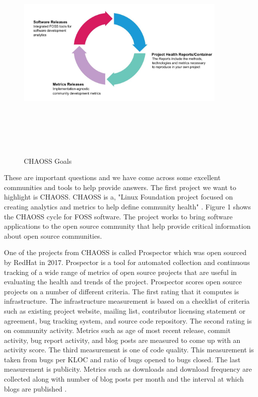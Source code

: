 \documentclass[journal]{IEEEtran}
\begin{document}
\begin{figure}
\centering
\includegraphics[width=4in,height=4.25in,clip,keepaspectratio]{images/chaossgoals.JPG}
\caption{CHAOSS Goals}
\end{figure}

These are important questions and we have come across some excellent communities and tools to help provide answers. The first project we want to highlight is CHAOSS. CHAOSS is a, "Linux Foundation project focused on creating analytics and metrics to help define community health" \cite{About}. Figure 1 shows the CHAOSS cycle for FOSS software. The project works to bring software applications to the open source community that help provide critical information about open source communities.  

One of the projects from CHAOSS is called Prospector which was open sourced by RedHat in 2017. Prospector is a tool for automated collection and continuous tracking of a wide range of metrics of open source projects that are useful in evaluating the health and trends of the project\cite{Prospector}. Prospector scores open source projects on a number of different criteria. The first rating that it computes is infrastructure. The infrastructure measurement is based on a checklist of criteria such as existing project website, mailing list, contributor licensing statement or agreement, bug tracking system, and source code repository. The second rating is on community activity. Metrics such as age of most recent release, commit activity, bug report activity, and blog posts are measured to come up with an activity score. The third measurement is one of code quality. This measurement is taken from bugs per KLOC and ratio of bugs opened to bugs closed. The last measurement is publicity. Metrics such as downloads and download frequency are collected along with number of blog posts per month and the interval at which blogs are published \cite{Open}. 
\end{document}
